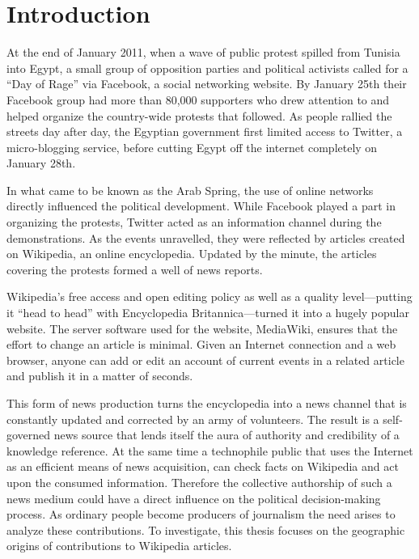 \chapter{Introduction}\label{ch:introduction}


At the end of January 2011, when a wave of public protest spilled from Tunisia into Egypt, a small group of opposition parties and political activists called for a ``Day of Rage'' via Facebook, a social networking website.
By January 25th their Facebook group had more than 80,000 supporters who drew attention to and helped organize the country-wide protests that followed. 
As people rallied the streets day after day, the Egyptian government first limited access to Twitter, a micro-blogging service, before cutting Egypt off the internet completely on January 28th.\cite{econ18013760, szegypt}

In what came to be known as the Arab Spring, the use of online networks directly influenced the political development.
While Facebook played a part in organizing the protests, Twitter acted as an information channel during the demonstrations.
As the events unravelled, they were reflected by articles created on Wikipedia, an online encyclopedia.
Updated by the minute, the articles covering the protests formed a well of news reports.\cite{wikiegypt}

Wikipedia's free access and open editing policy as well as a quality level---putting it ``head to head''\cite{giles2005internet} with Encyclopedia Britannica---turned it into a hugely popular website\cite{wikipv}.
The server software used for the website, MediaWiki, ensures that the effort to change an article is minimal.
Given an Internet connection and a web browser, anyone can add or edit an account of current events in a related article and publish it in a matter of seconds.

This form of news production turns the encyclopedia into a news channel that is constantly updated and corrected by an army of volunteers.
The result is a self-governed news source that lends itself the aura of authority and credibility of a knowledge reference.
At the same time a technophile public that uses the Internet as an efficient means of news acquisition, can check facts on Wikipedia and act upon the consumed information.\cite[p. 424--427]{chadwick2009routledge}
Therefore the collective authorship of such a news medium could have a direct influence on the political decision-making process.
As ordinary people become producers of journalism the need arises to analyze these contributions. 
To investigate, this thesis focuses on the geographic origins of contributions to Wikipedia articles.

